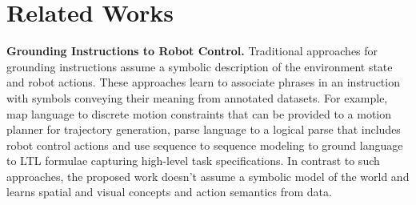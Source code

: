\section{Related Works}

\textbf{Grounding Instructions to Robot Control.} Traditional approaches for grounding instructions assume a symbolic description of the environment state 
and robot actions. 
%
These approaches learn to associate phrases in an instruction with symbols conveying their meaning from 
annotated datasets. 
%
For example, \cite{howard2014natural,paul2016efficient,tellex2011approaching} map language to discrete motion constraints that can be provided to a motion planner for trajectory generation, \cite{matuszek2013learning,knepper2013ikeabot} parse language to a logical parse that includes  robot control actions and \cite{gopalan2018sequence,williams2018learning} use sequence to sequence modeling to ground language to LTL formulae capturing high-level task specifications. 
%
%
In contrast to such approaches, the proposed work doesn't assume a symbolic model of the world and learns spatial and visual concepts and action semantics from data. 


